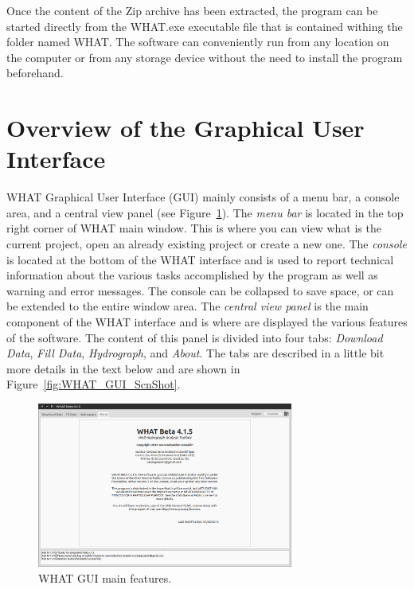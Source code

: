 \documentclass[12pt, letterpaper, fleqn]{report}
\begin{document}
Once the content of the Zip archive has been extracted, the program can be started directly from the WHAT.exe executable file that is contained withing the folder named WHAT. The software can conveniently run from any location on the computer or from any storage device without the need to install the program beforehand.

\section{Overview of the Graphical User Interface}


WHAT Graphical User Interface (GUI) mainly consists of a menu bar, a console area, and a central view panel (see Figure~\ref{fig:WHAT_GUI}). The \emph{menu bar} is located in the top right corner of WHAT main window. This is where you can view what is the current project, open an already existing project or create a new one. The \emph{console} is located at the bottom of the WHAT interface and is used to report technical information about the various tasks accomplished by the program as well as warning and error messages. The console can be collapsed to save space, or can be extended to the entire window area. The \emph{central view panel} is the main component of the WHAT interface and is where are displayed the various features of the software. The content of this panel is divided into four tabs: \emph{Download Data}, \emph{Fill Data}, \emph{Hydrograph}, and \emph{About}. The tabs are described in a little bit more details in the text below and are shown in Figure~\ref{fig:WHAT_GUI_ScnShot}.

\begin{figure}[h!]
\centering
\includegraphics[width=0.75\textwidth]{WHAT_GUI}
\caption[WHAT GUI main features.]{WHAT GUI main features.}
\label{fig:WHAT_GUI}
\end{figure}
\end{document}
